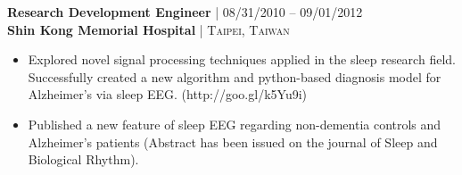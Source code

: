{\raggedright\normalsize
\textbf{Research Development Engineer} {\hfill\footnotesize\textsc{| 08/31/2010 -- 09/01/2012}} \\ 
\textbf{Shin Kong Memorial Hospital} {\hfill\footnotesize\textsc{| Taipei, Taiwan}}}

\begin{itemize}[leftmargin=*, topsep=2pt, partopsep=2.5pt]
\setlength\itemsep{1pt}

\item Explored novel signal processing techniques applied in the sleep research field. Successfully created a new algorithm and python-based diagnosis model for Alzheimer’s via sleep EEG. (http://goo.gl/k5Yu9i)

\item Published a new feature of sleep EEG regarding non-dementia controls and Alzheimer’s patients (Abstract has been issued on the journal of Sleep and Biological Rhythm).

\end{itemize}
